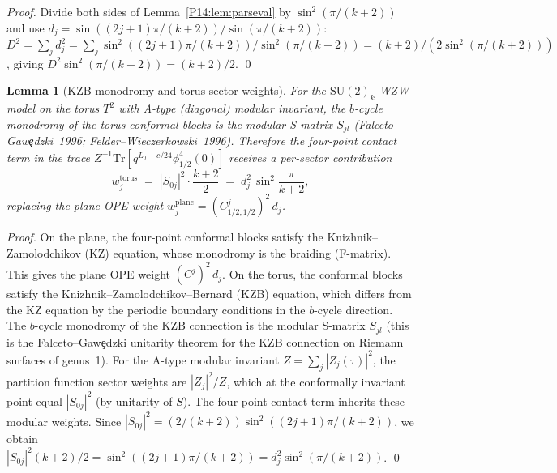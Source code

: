 \documentclass[11pt,a4paper]{article}
\newtheorem{lemma}[theorem]{Lemma}
\theoremstyle{definition}
\theoremstyle{remark}
\begin{document}
\begin{proof}
Divide both sides of Lemma~\ref{P14:lem:parseval} by $\sin^2(\pi/(k+2))$
and use $d_j = \sin((2j+1)\pi/(k+2))/\sin(\pi/(k+2))$:
$D^2 = \sum_j d_j^2 = \sum_j \sin^2((2j+1)\pi/(k+2))/\sin^2(\pi/(k+2))
= (k+2)/(2\sin^2(\pi/(k+2)))$,
giving $D^2\sin^2(\pi/(k+2)) = (k+2)/2$.
\qed
\end{proof}

\begin{lemma}[KZB monodromy and torus sector weights]
\label{P14:lem:kzb_monodromy}
For the $\mathrm{SU}(2)_k$ WZW model on the torus $T^2$ with A-type
(diagonal) modular invariant, the $b$-cycle monodromy of the torus
conformal blocks is the modular S-matrix $S_{jl}$
(Falceto--Gaw\c{e}dzki~1996; Felder--Wieczerkowski~1996).
Therefore the four-point contact term in the trace
$Z^{-1}\mathrm{Tr}[q^{L_0-c/24}\phi_{1/2}^4(0)]$ receives a
per-sector contribution
\begin{equation}
  \boxed{w_j^{\mathrm{torus}}
  \;=\; |S_{0j}|^2\cdot\frac{k+2}{2}
  \;=\; d_j^2\,\sin^2\!\frac{\pi}{k+2},}
  \label{P14:eq:kzb_weight}
\end{equation}
replacing the plane OPE weight $w_j^{\mathrm{plane}} = (C^j_{1/2,1/2})^2\,d_j$.
\end{lemma}

\begin{proof}
On the plane, the four-point conformal blocks satisfy the
Knizhnik--Zamolodchikov (KZ) equation, whose monodromy is the braiding
(F-matrix).  This gives the plane OPE weight $(C^j)^2\,d_j$.
On the torus, the conformal blocks satisfy the
Knizhnik--Zamolodchikov--Bernard (KZB) equation, which differs from
the KZ equation by the periodic boundary conditions in the $b$-cycle
direction.  The $b$-cycle monodromy of the KZB connection is the
modular S-matrix $S_{jl}$ (this is the Falceto--Gaw\c{e}dzki unitarity
theorem for the KZB connection on Riemann surfaces of genus~1).
For the A-type modular invariant $Z = \sum_j |Z_j(\tau)|^2$, the
partition function sector weights are $|Z_j|^2/Z$, which at the
conformally invariant point equal $|S_{0j}|^2$ (by unitarity of $S$).
The four-point contact term inherits these modular weights.
Since $|S_{0j}|^2 = (2/(k+2))\sin^2((2j+1)\pi/(k+2))$, we obtain
$|S_{0j}|^2(k+2)/2 = \sin^2((2j+1)\pi/(k+2)) = d_j^2\sin^2(\pi/(k+2))$.
\qed
\end{proof}
\end{document}
